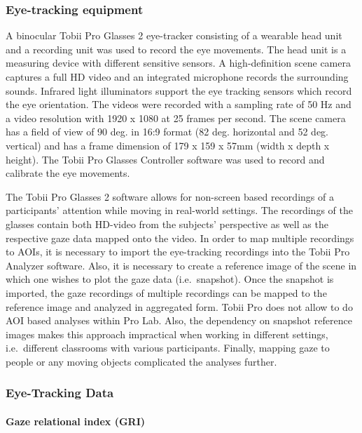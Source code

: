\documentclass[
  english,
  man,floatsintext]{apa6}
\let\oldparagraph\paragraph
\renewcommand{\paragraph}[1]{\oldparagraph{#1}\mbox{}}
\begin{document}
\hypertarget{eye-tracking-equipment}{%
\subsubsection{Eye-tracking equipment}\label{eye-tracking-equipment}}

A binocular Tobii Pro Glasses 2 eye-tracker consisting of a wearable head unit and a recording unit was used to record the eye movements. The head unit is a measuring device with different sensitive sensors. A high-definition scene camera captures a full HD video and an integrated microphone records the surrounding sounds. Infrared light illuminators support the eye tracking sensors which record the eye orientation. The videos were recorded with a sampling rate of 50 Hz and a video resolution with 1920 x 1080 at 25 frames per second. The scene camera has a field of view of 90 deg. in 16:9 format (82 deg. horizontal and 52 deg. vertical) and has a frame dimension of 179 x 159 x 57mm (width x depth x height). The Tobii Pro Glasses Controller software was used to record and calibrate the eye movements.

The Tobii Pro Glasses 2 software allows for non-screen based recordings of a participants' attention while moving in real-world settings. The recordings of the glasses contain both HD-video from the subjects' perspective as well as the respective gaze data mapped onto the video. In order to map multiple recordings to AOIs, it is necessary to import the eye-tracking recordings into the Tobii Pro Analyzer software. Also, it is necessary to create a reference image of the scene in which one wishes to plot the gaze data (i.e.~snapshot). Once the snapshot is imported, the gaze recordings of multiple recordings can be mapped to the reference image and analyzed in aggregated form. Tobii Pro does not allow to do AOI based analyses within Pro Lab. Also, the dependency on snapshot reference images makes this approach impractical when working in different settings, i.e.~different classrooms with various participants. Finally, mapping gaze to people or any moving objects complicated the analyses further.

\hypertarget{eye-tracking-data}{%
\subsubsection{Eye-Tracking Data}\label{eye-tracking-data}}

\hypertarget{gaze-relational-index-gri}{%
\paragraph{Gaze relational index (GRI)}\label{gaze-relational-index-gri}}
\end{document}
